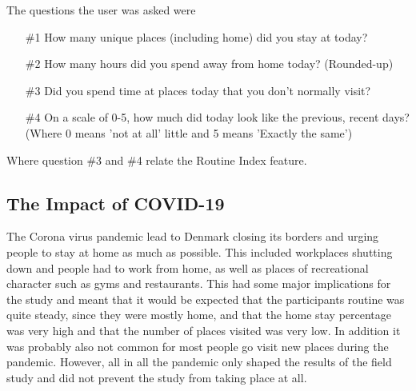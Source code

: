 The questions the user was asked were

\begin{itemize}
    \item[\#1] How many unique places (including home) did you stay at today?
    \item[\#2] How many hours did you spend away from home today? (Rounded-up)
    \item[\#3] Did you spend time at places today that you don't normally visit?
    \item[\#4] On a scale of 0-5, how much did today look like the previous, recent days? (Where 0 means 'not at all' little and 5 means 'Exactly the same')
\end{itemize}

Where question \#3 and \#4 relate the Routine Index feature.

\subsection{The Impact of COVID-19}
The Corona virus pandemic lead to Denmark closing its borders and urging people to stay at home as much as possible. This included workplaces shutting down and people had to work from home, as well as places of recreational character such as gyms and restaurants. This had some major implications for the study and meant that it would be expected that the participants routine was quite steady, since they were mostly home, and that the home stay percentage was very high and that the number of places visited was very low. In addition it was probably also not common for most people go visit new places during the pandemic. However, all in all the pandemic only shaped the results of the field study and did not prevent the study from taking place at all.


